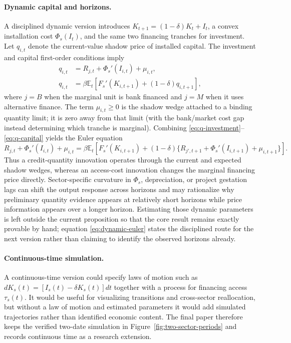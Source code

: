 \documentclass[11pt]{article}
\theoremstyle{definition}
\theoremstyle{remark}
\newcommand{\E}{\mathbb{E}}
\begin{document}
\paragraph{Dynamic capital and horizons.}
A disciplined dynamic version introduces
$K_{t+1}=(1-\delta)K_t+I_t$, a convex installation cost $\Phi_s(I_t)$, and
the same two financing tranches for investment.  Let $q_{i,t}$ denote the
current-value shadow price of installed capital.  The investment and capital
first-order conditions imply
\begin{align}
 q_{i,t}
   &= R_{j,t}+\Phi_s'(I_{i,t})+\mu_{i,t},
   \label{eq:q-investment}\\
 q_{i,t}
   &= \beta\E_t\!\left[
       F_s'(K_{i,t+1})+(1-\delta)q_{i,t+1}
     \right],
   \label{eq:q-capital}
\end{align}
where $j=B$ when the marginal unit is bank financed and $j=M$ when it uses
alternative finance.  The term $\mu_{i,t}\geq0$ is the shadow wedge attached to a
binding quantity limit; it is zero away from that limit (with the bank/market
cost gap instead determining which tranche is marginal).  Combining
\eqref{eq:q-investment}--\eqref{eq:q-capital} yields the Euler equation
\begin{equation}
 R_{j,t}+\Phi_s'(I_{i,t})+\mu_{i,t}
 =\beta\E_t\!\left[
 F_s'(K_{i,t+1})+(1-\delta)
 \{R_{j',t+1}+\Phi_s'(I_{i,t+1})+\mu_{i,t+1}\}
 \right].
 \label{eq:dynamic-euler}
\end{equation}
Thus a credit-quantity innovation operates through the current and expected
shadow wedges, whereas an access-cost innovation changes the marginal
financing price directly. Sector-specific curvature in $\Phi_s$, depreciation, or
project gestation lags can shift the output response across horizons and may
rationalize why preliminary quantity evidence appears at relatively short
horizons while price information appears over a longer horizon. Estimating
those dynamic parameters is left outside the current proposition so that the
core result remains exactly provable by hand; equation
\eqref{eq:dynamic-euler} states the disciplined route for the next version
rather than claiming to identify the observed horizons already.

\paragraph{Continuous-time simulation.}
A continuous-time version could specify laws of motion such as
$dK_s(t)=[I_s(t)-\delta K_s(t)]dt$ together with a process for financing access
$\tau_s(t)$. It would be useful for visualizing transitions and cross-sector
reallocation, but without a law of motion and estimated parameters it would
add simulated trajectories rather than identified economic content. The final
paper therefore keeps the verified two-date simulation in
Figure~\ref{fig:two-sector-periods} and records continuous time as a research
extension.
\end{document}
